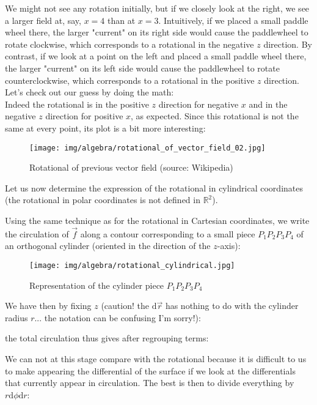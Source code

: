 	\begin{tcolorbox}[colframe=black,colback=white,sharp corners]
	We might not see any rotation initially, but if we closely look at the right, we see a larger field at, say, $x=4$ than at $x=3$. Intuitively, if we placed a small paddle wheel there, the larger "current" on its right side would cause the paddlewheel to rotate clockwise, which corresponds to a rotational in the negative $z$ direction. By contrast, if we look at a point on the left and placed a small paddle wheel there, the larger "current" on its left side would cause the paddlewheel to rotate counterclockwise, which corresponds to a rotational in the positive $z$ direction. Let's check out our guess by doing the math:\\
	
	Indeed the rotational is in the positive $z$ direction for negative $x$ and in the negative $z$ direction for positive $x$, as expected. Since this rotational is not the same at every point, its plot is a bit more interesting:
	\begin{figure}[H]
		\centering
		\texttt{[image: img/algebra/rotational\_of\_vector\_field\_02.jpg]}
		\caption[]{Rotational of previous vector field (source: Wikipedia)}
	\end{figure}
	\end{tcolorbox}
	\pagebreak	
	Let us now determine the expression of the rotational in cylindrical coordinates (the rotational in polar coordinates is not defined in $\mathbb{R}^2$).
	
	Using the same technique as for the rotational in Cartesian coordinates, we write the circulation of $\vec{f}$ along a contour corresponding to a small piece $P_1P_2P_3P_4$ of an orthogonal cylinder (oriented in the direction of the $z$-axis):
	\begin{figure}[H]
		\centering
		\texttt{[image: img/algebra/rotational\_cylindrical.jpg]}
		\caption[]{Representation of the cylinder piece $P_1P_2P_3P_4$}
	\end{figure}
	We have then by fixing $z$ (caution! the $\mathrm{d}\vec{r}$ has nothing to do with the cylinder radius $r$... the notation can be confusing I'm sorry!):
	
	the total circulation thus gives after regrouping terms:
	
	We can not at this stage compare with the rotational because it is difficult to us to make appearing the differential of the surface if we look at the differentials that currently appear in circulation. The best is then to divide everything by $r\mathrm{d}\phi\mathrm{d}r$:
	
